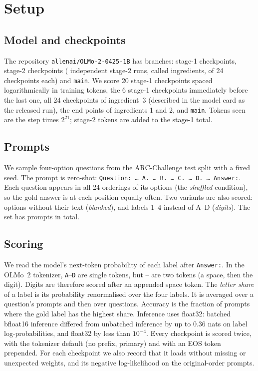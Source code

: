 \documentclass[11pt,a4paper]{article}
\begin{document}
\section{Setup}
\subsection{Model and checkpoints}
The repository \texttt{allenai/OLMo-2-0425-1B} has \NBranches{} branches: \NStageOne{} stage-1 checkpoints, \NStageTwo{} stage-2 checkpoints (\NIngredients{} independent stage-2 runs, called ingredients, of 24 checkpoints each) and \texttt{main}. We score 20 stage-1 checkpoints spaced logarithmically in training tokens, the 6 stage-1 checkpoints immediately before the last one, all 24 checkpoints of ingredient~3 (described in the model card as the released run), the end points of ingredients 1 and 2, and \texttt{main}. Tokens seen are the step times $2^{21}$; stage-2 tokens are added to the stage-1 total.

\subsection{Prompts}
We sample \NQuestions{} four-option questions from the ARC-Challenge test split \citep{arc} with a fixed seed. The prompt is zero-shot: \texttt{Question: \ldots{} A. \ldots{} B. \ldots{} C. \ldots{} D. \ldots{} Answer:}. Each question appears in all 24 orderings of its options (the \emph{shuffled} condition), so the gold answer is at each position equally often. Two variants are also scored: options without their text (\emph{blanked}), and labels 1--4 instead of A--D (\emph{digits}). The set has \NPrompts{} prompts in total.

\subsection{Scoring}
We read the model's next-token probability of each label after \texttt{Answer:}. In the OLMo~2 tokenizer, \texttt{\textvisiblespace A}--\texttt{\textvisiblespace D} are single tokens, but \texttt{}--\texttt{} are two tokens (a space, then the digit). Digits are therefore scored after an appended space token. The \emph{letter share} of a label is its probability renormalised over the four labels. It is averaged over a question's prompts and then over questions. Accuracy is the fraction of prompts where the gold label has the highest share. Inference uses float32: batched bfloat16 inference differed from unbatched inference by up to 0.36 nats on label log-probabilities, and float32 by less than $10^{-4}$. Every checkpoint is scored twice, with the tokenizer default (no prefix, primary) and with an EOS token prepended. For each checkpoint we also record that it loads without missing or unexpected weights, and its negative log-likelihood on the original-order prompts.
\end{document}
